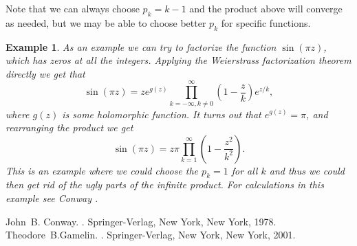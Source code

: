\documentclass[12pt]{article}
\theoremstyle{theorem}
\newtheorem*{example}{Example}
\theoremstyle{definition}
\theoremstyle{remark}
\begin{document}
Note that we can always choose $p_k = k-1$ and the product above will converge as needed, but we may be able to choose better $p_k$ for specific functions.

\begin{example}
As an example we can try to factorize the function $\sin (\pi z)$, which has zeros at all the integers.  Applying the Weierstrass factorization theorem directly we get that
\begin{equation*}
\sin (\pi z) =
z e^{g(z)} \prod_{k = -\infty, k \not= 0}^\infty \left( 1 - \frac{z}{k} \right) e^{z/k},
\end{equation*}
where $g(z)$ is some holomorphic function.  It turns out that $e^{g(z)} = \pi$,
and rearranging the product we get
\begin{equation*}
\sin (\pi z) =
z \pi \prod_{k = 1}^\infty \left( 1 - \frac{z^2}{k^2} \right) .
\end{equation*}
This is an example where we could choose the $p_k = 1$ for all $k$ and thus
we could then get rid of the ugly parts of the infinite product.  For 
calculations in this example see Conway \cite{Conway:complexI}.
\end{example}


\begin{thebibliography}{9}
John~B. Conway.
{\em {}}.
Springer-Verlag, New York, New York, 1978.
Theodore~B.\@ Gamelin.
{\em {}}.
Springer-Verlag, New York, New York, 2001.
\end{thebibliography}
\end{document}
